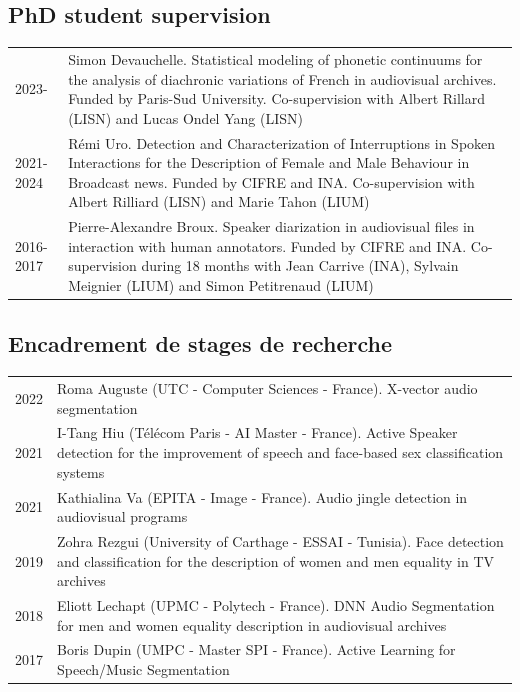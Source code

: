 \begin{en}
\subsection{PhD student supervision}
\begin{tabularx}{\linewidth}{@{}l X@{}}
2023- & Simon Devauchelle. Statistical modeling of phonetic continuums for the analysis of diachronic variations of French in audiovisual archives. Funded by Paris-Sud University. Co-supervision with Albert Rillard (LISN) and Lucas Ondel Yang (LISN)\\
2021-2024 & Rémi Uro. Detection and Characterization of Interruptions in Spoken Interactions for the Description of Female and Male Behaviour in Broadcast news. Funded by CIFRE and INA. Co-supervision with Albert Rilliard (LISN) and Marie Tahon (LIUM)\\
2016-2017 & Pierre-Alexandre Broux. Speaker diarization in audiovisual files in interaction with human annotators. Funded by CIFRE and INA. Co-supervision during 18 months with Jean Carrive (INA), Sylvain Meignier (LIUM) and Simon Petitrenaud (LIUM)\\
\end{tabularx}
\end{en}



\begin{fr}
\subsection{Encadrement de stages de recherche}
\begin{tabularx}{\linewidth}{@{}l X@{}}
2022 & Roma Auguste (UTC - Computer Sciences - France). X-vector audio segmentation\\
2021 & I-Tang Hiu (Télécom Paris - AI Master - France). Active Speaker detection for the improvement of speech and face-based sex classification systems\\
2021 & Kathialina Va (EPITA - Image - France). Audio jingle detection in audiovisual programs\\
2019 & Zohra Rezgui (University of Carthage - ESSAI - Tunisia). Face detection and classification for the description of women and men equality in TV archives\\
2018 & Eliott Lechapt (UPMC - Polytech - France). DNN Audio Segmentation for men and women equality description in audiovisual archives\\
2017 & Boris Dupin (UMPC - Master SPI - France). Active Learning for Speech/Music Segmentation\\
\end{tabularx}

\end{fr}


